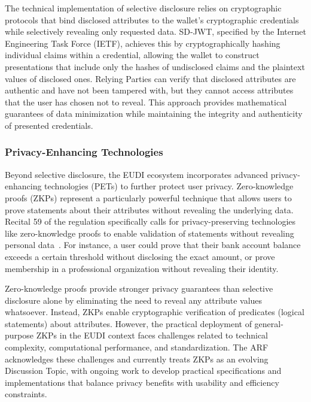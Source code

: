 \documentclass[sigconf,balance,nonacm,authordraft]{acmart}
\begin{document}
The technical implementation of selective disclosure relies on cryptographic protocols that bind disclosed attributes to the wallet's cryptographic credentials while selectively revealing only requested data. SD-JWT, specified by the Internet Engineering Task Force (IETF), achieves this by cryptographically hashing individual claims within a credential, allowing the wallet to construct presentations that include only the hashes of undisclosed claims and the plaintext values of disclosed ones. Relying Parties can verify that disclosed attributes are authentic and have not been tampered with, but they cannot access attributes that the user has chosen not to reveal. This approach provides mathematical guarantees of data minimization while maintaining the integrity and authenticity of presented credentials.

\subsubsection{Privacy-Enhancing Technologies}

Beyond selective disclosure, the EUDI ecosystem incorporates advanced privacy-enhancing technologies (PETs) to further protect user privacy. Zero-knowledge proofs (ZKPs) represent a particularly powerful technique that allows users to prove statements about their attributes without revealing the underlying data. Recital 59 of the regulation specifically calls for privacy-preserving technologies like zero-knowledge proofs to enable validation of statements without revealing personal data~\cite{ZKPDiscussion_Recital59}. For instance, a user could prove that their bank account balance exceeds a certain threshold without disclosing the exact amount, or prove membership in a professional organization without revealing their identity.

Zero-knowledge proofs provide stronger privacy guarantees than selective disclosure alone by eliminating the need to reveal any attribute values whatsoever. Instead, ZKPs enable cryptographic verification of predicates (logical statements) about attributes. However, the practical deployment of general-purpose ZKPs in the EUDI context faces challenges related to technical complexity, computational performance, and standardization. The ARF acknowledges these challenges and currently treats ZKPs as an evolving Discussion Topic, with ongoing work to develop practical specifications and implementations that balance privacy benefits with usability and efficiency constraints.
\end{document}
